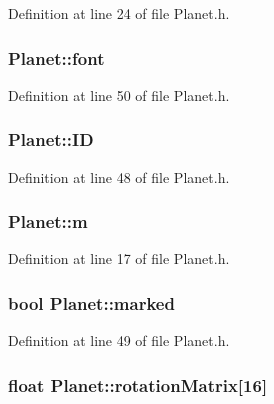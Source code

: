 Definition at line 24 of file Planet.\+h.

\hypertarget{class_planet_a7a9f21f63faf830b6bbbbec3e0ac668c}{
\subsubsection[{font}]{ Planet\+::font\hspace{0.3cm}{\ttfamily [protected]}}}\label{class_planet_a7a9f21f63faf830b6bbbbec3e0ac668c}


Definition at line 50 of file Planet.\+h.

\hypertarget{class_planet_aa0ecbff60832f5532799b452fa45783d}{
\subsubsection[{I\+D}]{ Planet\+::\+I\+D\hspace{0.3cm}{\ttfamily [protected]}}}\label{class_planet_aa0ecbff60832f5532799b452fa45783d}


Definition at line 48 of file Planet.\+h.

\hypertarget{class_planet_aba2872d5b503c1f36436bc7e05b27b51}{
\subsubsection[{m}]{ Planet\+::m}}\label{class_planet_aba2872d5b503c1f36436bc7e05b27b51}


Definition at line 17 of file Planet.\+h.

\hypertarget{class_planet_a0e7b5b758400af733e7a06380ff4cf84}{
\subsubsection[{marked}]{\setlength{\rightskip}{0pt plus 5cm}bool Planet\+::marked\hspace{0.3cm}{\ttfamily [protected]}}}\label{class_planet_a0e7b5b758400af733e7a06380ff4cf84}


Definition at line 49 of file Planet.\+h.

\hypertarget{class_planet_adc07c8cd520fd4dac2c646c30085c65b}{
\subsubsection[{rotation\+Matrix}]{\setlength{\rightskip}{0pt plus 5cm}float Planet\+::rotation\+Matrix\mbox{[}16\mbox{]}}}\label{class_planet_adc07c8cd520fd4dac2c646c30085c65b}


